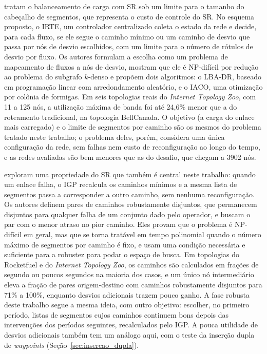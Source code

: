 \citet{yang2023intelligent} tratam o balanceamento de carga com SR sob um limite para o tamanho do cabeçalho de segmentos, que representa o custo de controle do SR. No esquema proposto, o IRTE, um controlador centralizado coleta o estado da rede e decide, para cada fluxo, se ele segue o caminho mínimo ou um caminho de desvio que passa por nós de desvio escolhidos, com um limite para o número de rótulos de desvio por fluxo. Os autores formulam a escolha como um problema de mapeamento de fluxos a nós de desvio, mostram que ele é NP-difícil por redução ao problema do subgrafo $k$-denso e propõem dois algoritmos: o LBA-DR, baseado em programação linear com arredondamento aleatório, e o IACO, uma otimização por colônia de formigas. Em seis topologias reais do \textit{Internet Topology Zoo}, com 11 a 125 nós, a utilização máxima de banda foi até 24,6\% menor que a do roteamento tradicional, na topologia BellCanada. O objetivo (a carga do enlace mais carregado) e o limite de segmentos por caminho são os mesmos do problema tratado neste trabalho; o problema deles, porém, considera uma única configuração da rede, sem falhas nem custo de reconfiguração ao longo do tempo, e as redes avaliadas são bem menores que as do desafio, que chegam a 3902 nós.

\citet{aubry2018robustly} exploram uma propriedade do SR que também é central neste trabalho: quando um enlace falha, o IGP recalcula os caminhos mínimos e a mesma lista de segmentos passa a corresponder a outro caminho, sem nenhuma reconfiguração. Os autores definem pares de caminhos robustamente disjuntos, que permanecem disjuntos para qualquer falha de um conjunto dado pelo operador, e buscam o par com o menor atraso no pior caminho. Eles provam que o problema é NP-difícil em geral, mas que se torna tratável em tempo polinomial quando o número máximo de segmentos por caminho é fixo, e usam uma condição necessária e suficiente para a robustez para podar o espaço de busca. Em topologias do Rocketfuel e do \textit{Internet Topology Zoo}, os caminhos são calculados em frações de segundo ou poucos segundos na maioria dos casos, e um único nó intermediário eleva a fração de pares origem-destino com caminhos robustamente disjuntos para 71\% a 100\%, enquanto desvios adicionais trazem pouco ganho. A fase robusta deste trabalho segue a mesma ideia, com outro objetivo: escolher, no primeiro período, listas de segmentos cujos caminhos continuem bons depois das intervenções dos períodos seguintes, recalculados pelo IGP. A pouca utilidade de desvios adicionais também tem um análogo aqui, com o teste da inserção dupla de \textit{waypoints} (Seção~\ref{sec:insercao_dupla}).

